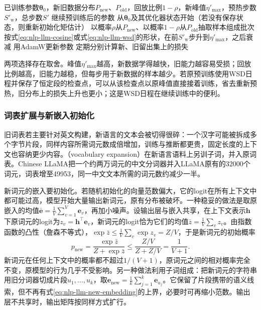 \begin{algorithm}[带回放与重新预热的继续预训练]
  \label{alg:nlp-llm-continual-pretraining}
  \begin{algorithmic}[1]
    \Require 已训练参数$\bm\theta_0$，新旧数据分布$P_{\mathrm{new}}$、$P_{\mathrm{old}}$，回放比例$1-\rho$，新峰值$\eta'_{\max}$，预热步数$S'_{\mathrm w}$，总步数$S'$
    \Ensure 继续预训练后的参数
    \State 从$\bm\theta_0$及其优化器状态开始（若没有保存状态，则重新初始化矩估计）
      \State 以概率$\rho$从$P_{\mathrm{new}}$、以概率$1-\rho$从$P_{\mathrm{old}}$抽取样本组成批次
      \State 按式\eqref{eq:nlp-llm-cosine}或式\eqref{eq:nlp-llm-wsd}的形状，在前$S'_{\mathrm w}$步升到$\eta'_{\max}$，之后衰减
      \State 用AdamW更新参数
      \State 定期分别计算新、旧留出集上的损失
    \EndFor
  \end{algorithmic}
\end{algorithm}

两项选择存在取舍。峰值$\eta'_{\max}$越高，新数据学得越快，旧能力越容易受损；回放比例越高，旧能力越稳，但每步用于新数据的样本越少。若原预训练使用WSD日程并保存了恒定段的检查点，可以从该检查点以原峰值直接接着训练，省去重新预热，旧分布上的损失上升也更小；这是WSD日程在继续训练中的便利。

\subsubsection{词表扩展与新嵌入初始化}
\label{sec:nlp-llm-vocab-extension}

旧词表若主要针对英文构建，新语言的文本会被切得很碎：一个汉字可能被拆成多个字节片段，同样内容所需词元数成倍增加，训练与推断都更贵，固定长度的上下文也容纳更少内容。（vocabulary expansion）在新语言语料上另训子词，并入原词表。Chinese LLaMA把一个约两万词元的中文分词器并入LLaMA原有的32000个词元，词表增至49953，同一中文文本所需的词元数约减少一半。

新词元的嵌入要初始化。若随机初始化的向量范数偏大，它的logit在所有上下文中都可能过高，模型开始大量输出新词元，原有分布被破坏。一种稳妥的做法是取原嵌入的均值$\bar{\bm e}=\frac1V\sum_{v=1}^{V}\bm e_v$，再加小噪声。设输出层与嵌入共享，在上下文表示$\bm h$下原词元的logit为$z_v=\bm h^{\top}\bm e_v$，新词元的logit恰为它们的均值$\bar z=\frac1V\sum_v z_v$。由指数函数的凸性（詹森不等式），$\exp\bar z\leq\frac1V\sum_v\exp z_v=Z/V$，于是新词元的初始概率
\begin{equation}
 p_{\mathrm{new}}=\frac{\exp\bar z}{Z+\exp\bar z}\leq\frac{Z/V}{Z+Z/V}=\frac1{V+1}.
 \label{eq:nlp-llm-new-embedding}
\end{equation}
新词元在任何上下文中的概率都不超过$1/(V+1)$，原词元之间的相对概率完全不变，原模型的行为几乎不受影响。另一种做法利用子词组成：把新词元的字符串用旧分词器切成片段$u_1,\ldots,u_k$，取$\bm e_{\mathrm{new}}=\frac1k\sum_{j=1}^{k}\bm e_{u_j}$。它保留了片段携带的语义线索，但不再有式\eqref{eq:nlp-llm-new-embedding}的上界，必要时可再缩小范数。输出层不共享时，输出矩阵按同样方式扩行。

